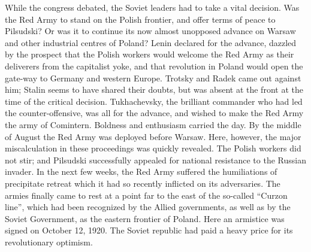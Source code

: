 While the congress debated, the Soviet leaders had to take a vital decision. Was the Red Army to stand on the Polish frontier, and offer terms of peace to Pilsudski? Or was it to continue its now almost unopposed advance on Warsaw and other industrial centres of Poland? Lenin declared for the advance, dazzled by the prospect that the Polish workers would welcome the Red Army as their deliverers from the capitalist yoke, and that revolution in Poland would open the gate-way to Germany and western Europe. Trotsky and Radek came out against him; Stalin seems to have shared their doubts, but was absent at the front at the time of the critical decision. Tukhachevsky, the brilliant commander who had led the counter-offensive, was all for the advance, and wished to make the Red Army the army of Comintern. Boldness and enthusiasm carried the day. By the middle of August the Red Army was deployed before Warsaw. Here, however, the major miscalculation in these proceedings was quickly revealed. The Polish workers did not stir; and Pilsudski successfully appealed for national resistance to the Russian invader. In the next few weeks, the Red Army suffered the humiliations of precipitate retreat which it had so recently inflicted on its adversaries. The armies finally came to rest at a point far to the east of the so-called ``Curzon line'', which had been recognized by the Allied governments, as well as by the Soviet Government, as the eastern frontier of Poland. Here an armistice was signed on October 12, 1920. The Soviet republic had paid a heavy price for its revolutionary optimism. 

